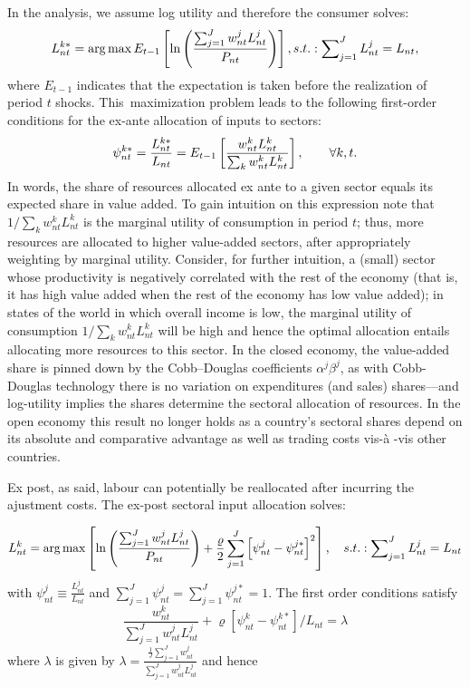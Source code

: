 \documentclass{article}
\begin{document}
In the analysis, we assume log utility and therefore the consumer solves: 
\begin{equation}
L_{nt}^{k\ast }=\arg \max E_{t-1}\left[ \ln \left( \frac{%
\sum_{j=1}^{J}w_{nt}^{j}L_{nt}^{j}}{P_{nt}}\right) \right]
,s.t.:\sum\nolimits_{j=1}^{J}L_{nt}^{j}=L_{nt},  \label{eq:log:utility}
\end{equation}%
where $E_{t-1}$ indicates that the expectation is taken before the
realization of period $t$ shocks. This\ maximization problem leads to the
following first-order conditions for the ex-ante allocation of inputs to
sectors: 
\begin{equation}
\psi _{nt}^{k\ast }=\frac{L_{nt}^{k\ast }}{L_{nt}}=E_{t-1}\left[ \frac{%
w_{nt}^{k}L_{nt}^{k}}{\sum_{k}w_{nt}^{k}L_{nt}^{k}}\right] ,\qquad \forall
k,t.  \label{eq:FOC}
\end{equation}%
In words, the share of resources allocated ex ante to a given sector equals
its expected share in value added. To gain intuition on this expression note
that $1/\sum_{k}w_{nt}^{k}L_{nt}^{k}$ is the marginal utility of consumption
in period $t$; thus, more resources are allocated to higher value-added
sectors, after appropriately weighting by marginal utility. Consider, for
further intuition, a (small) sector whose productivity is negatively
correlated with the rest of the economy (that is, it has high value added
when the rest of the economy has low value added); in states of the world in
which overall income is low, the marginal utility of consumption $%
1/\sum_{k}w_{nt}^{k}L_{nt}^{k}$ will be high and hence the optimal
allocation entails allocating more resources to this sector. In the closed
economy, the value-added share is pinned down by the Cobb--Douglas
coefficients $\alpha ^{j}\beta ^{j}$, as with Cobb-Douglas technology there
is no variation on expenditures (and sales) shares---and log-utility implies
the shares determine the sectoral allocation of resources. In the open
economy this result no longer holds as a country's sectoral shares depend on
its absolute and comparative advantage as well as trading costs vis-\`{a}%
-vis other countries.

Ex post, as said, labour can potentially be reallocated after incurring the
ajustment costs. The ex-post sectoral input allocation solves:

\begin{equation}
L_{nt}^{k}=\arg \max \left[ \ln \left( \frac{%
\sum_{j=1}^{J}w_{nt}^{j}L_{nt}^{j}}{P_{nt}}\right) +\frac{\varrho }{2}%
\sum_{j=1}^{J}\left[ \psi _{nt}^{j}-\psi _{nt}^{j\ast }\right] ^{2}\right] ,%
\text{ }s.t.:\sum\nolimits_{j=1}^{J}L_{nt}^{j}=L_{nt}
\end{equation}%
with $\psi _{nt}^{j}\equiv \frac{L_{nt}^{j}}{L_{nt}}$ and $%
\sum_{j=1}^{J}\psi _{nt}^{j}=\sum_{j=1}^{J}\psi _{nt}^{j\ast }=1.$ The first
order conditions satisfy%
\begin{equation}
\frac{w_{nt}^{k}}{\sum_{j=1}^{J}w_{nt}^{j}L_{nt}^{j}}+\varrho \left[ \psi
_{nt}^{k}-\psi _{nt}^{k\ast }\right]/L_{nt} =\lambda
\end{equation}%
where $\lambda $ is given by $\lambda =\frac{\frac{1}{J}%
\sum_{j=1}^{J}w_{nt}^{j}}{\sum_{j=1}^{J}w_{nt}^{j}L_{nt}^{j}}$ and hence
\end{document}
